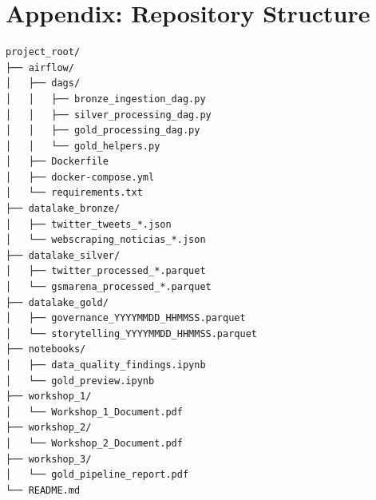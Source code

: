 \documentclass[12pt]{article}
\begin{document}
\newpage

\section{Appendix: Repository Structure}
\label{sec:appendix}

\begin{verbatim}
project_root/
├── airflow/
│   ├── dags/
│   │   ├── bronze_ingestion_dag.py
│   │   ├── silver_processing_dag.py
│   │   ├── gold_processing_dag.py
│   │   └── gold_helpers.py
│   ├── Dockerfile
│   ├── docker-compose.yml
│   └── requirements.txt
├── datalake_bronze/
│   ├── twitter_tweets_*.json
│   └── webscraping_noticias_*.json
├── datalake_silver/
│   ├── twitter_processed_*.parquet
│   └── gsmarena_processed_*.parquet
├── datalake_gold/
│   ├── governance_YYYYMMDD_HHMMSS.parquet
│   └── storytelling_YYYYMMDD_HHMMSS.parquet
├── notebooks/
│   ├── data_quality_findings.ipynb
│   └── gold_preview.ipynb
├── workshop_1/
│   └── Workshop_1_Document.pdf
├── workshop_2/
│   └── Workshop_2_Document.pdf
├── workshop_3/
│   └── gold_pipeline_report.pdf
└── README.md
\end{verbatim}
\end{document}
